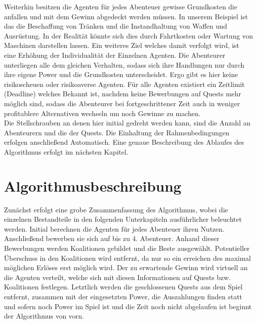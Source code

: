\documentclass[fleqn,10pt]{SelfArx} %
\begin{document}
Weiterhin besitzen die Agenten für jedes Abenteuer gewisse Grundkosten die anfallen und mit dem Gewinn abgedeckt werden müssen. In unserem Beispiel ist das die Beschaffung von Tränken und die Instandhaltung von Waffen und Ausrüstung. In der Realität könnte sich dies durch Fahrtkosten oder Wartung von Maschinen darstellen lassen. Ein weiteres Ziel welches damit verfolgt wird, ist eine Erhöhung der Individualität der Einzelnen Agenten. Die Abenteurer unterliegen alle dem gleichen Verhalten, sodass sich ihre Handlungen nur durch ihre eigene Power und die Grundkosten unterscheidet. Ergo gibt es hier keine risikoscheuen oder risikoaverse Agenten. Für alle Agenten existiert ein Zeitlimit (Deadline) welches Bekannt ist, nachdem keine Bewerbungen auf Quests mehr möglich sind, sodass die Abenteurer bei fortgeschrittener Zeit auch in weniger profitablere Alternativen wechseln um noch Gewinne zu machen.\\
Die Stellschrauben an denen hier initial gedreht werden kann, sind die Anzahl an Abenteurern und die der Quests. Die Einhaltung der Rahmenbedingungen erfolgen anschließend Automatisch. Eine genaue Beschreibung des Ablaufes des Algorithmus erfolgt im nächsten Kapitel.\\






\section{Algorithmusbeschreibung}
\label{sec:Algorithmus}
Zunächst erfolgt eine grobe Zusammenfassung des Algorithmus, wobei die einzelnen Bestandteile in den folgenden Unterkapiteln ausführlicher beleuchtet werden. Initial berechnen die Agenten für jedes Abenteuer ihren Nutzen. Anschließend bewerben sie sich auf bis zu 4. Abenteuer. Anhand dieser Bewerbungen werden Koalitionen gebildet und die Beste ausgewählt. Potentieller Überschuss in den Koalitionen wird entfernt, da nur so ein erreichen des maximal möglichen Erlöses erst möglich wird. Der zu erwartende Gewinn wird virtuell an die Agenten verteilt, welche sich mit diesen Informationen auf Quests bzw. Koalitionen festlegen. Letztlich werden die geschlossenen Quests aus dem Spiel entfernt, zusammen mit der eingesetzten Power, die Auszahlungen finden statt und sofern noch Power im Spiel ist und die Zeit noch nicht abgelaufen ist beginnt der Algorithmus von vorn.
\end{document}
